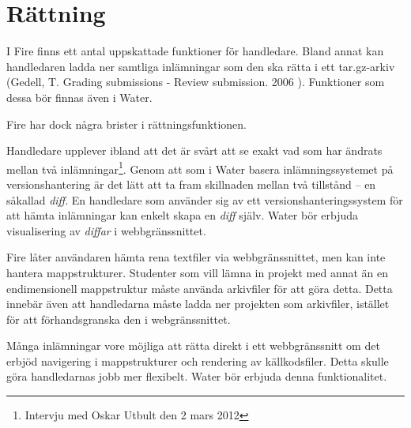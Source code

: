 \section{Rättning}

I Fire finns ett antal uppskattade funktioner för handledare. Bland annat kan handledaren ladda ner samtliga inlämningar som den ska rätta i ett tar.gz-arkiv (Gedell, T. Grading submissions - Review submission. 2006 ). Funktioner som dessa bör finnas även i Water.

Fire har dock några brister i rättningsfunktionen.

Handledare upplever ibland att det är svårt att se exakt vad som har ändrats mellan två inlämningar\footnote{Intervju med Oskar Utbult den 2 mars 2012}. Genom att som i Water basera inlämningssystemet på versionshantering är det lätt att ta fram skillnaden mellan två tillstånd – en såkallad \emph{diff}. En handledare som använder sig av ett versionshanteringssystem för att hämta inlämningar kan enkelt skapa en \emph{diff} själv. Water bör erbjuda visualisering av \emph{diffar} i webbgränssnittet.

Fire låter användaren hämta rena textfiler via webbgränssnittet, men kan inte hantera mappstrukturer. Studenter som vill lämna in projekt med annat än en endimensionell mappstruktur måste använda arkivfiler för att göra detta. Detta innebär även att handledarna måste ladda ner projekten som arkivfiler, istället för att förhandsgranska den i webgränssnittet.

Många inlämningar vore möjliga att rätta direkt i ett webbgränssnitt om det erbjöd navigering i mappstrukturer och rendering av källkodsfiler. Detta skulle göra handledarnas jobb mer flexibelt. Water bör erbjuda denna funktionalitet.
